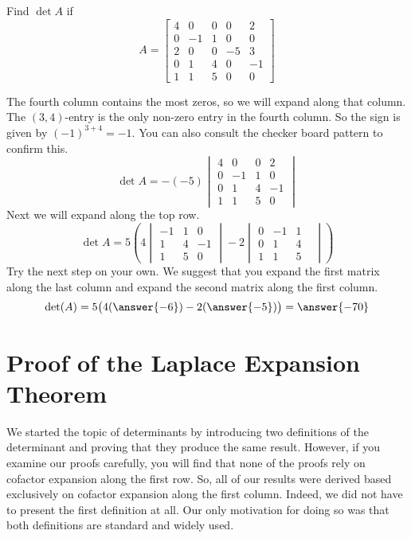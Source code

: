 \documentclass{ximera}
\begin{document}
\begin{example}Find $\det{A}$ if
$$A=\begin{bmatrix}4&0&0&0&2\\0&-1&1&0&0\\2&0&0&-5&3\\0&1&4&0&-1\\1&1&5&0&0\end{bmatrix}$$

\begin{explanation}
The fourth column contains the most zeros, so we will expand along that column.  The  $(3, 4)$-entry is the only non-zero entry in the fourth column.  So the sign is given by $(-1)^{3+4}=-1$.  You can also consult the checker board pattern to confirm this.  
$$\det{A}=-(-5)\begin{vmatrix}4&0&0&2\\0&-1&1&0\\0&1&4&-1\\1&1&5&0\end{vmatrix}
$$
Next we will expand along the top row.
$$\det{A}=5\left(4\begin{vmatrix}-1&1&0\\1&4&-1\\1&5&0\end{vmatrix}-2\begin{vmatrix}0&-1&1\\0&1&4&\\1&1&5\end{vmatrix}\right)$$
Try the next step on your own.  We suggest that you expand the first matrix along the last column and expand the second matrix along the first column.
$$\text{det}(A)=5\big(4(\answer{-6})-2(\answer{-5})\big)=\answer{-70}$$
\end{explanation}
\end{example}

\section*{Proof of the Laplace Expansion Theorem}

We started the topic of determinants by introducing two definitions of the determinant and proving that they produce the same result.  However, if you examine our proofs carefully, you will find that none of the proofs rely on cofactor expansion along the first row.  So, all of our results were derived based exclusively on cofactor expansion along the first column.  Indeed, we did not have to present the first definition at all. Our only motivation for doing so was that both definitions are standard and widely used. 
\end{document}
